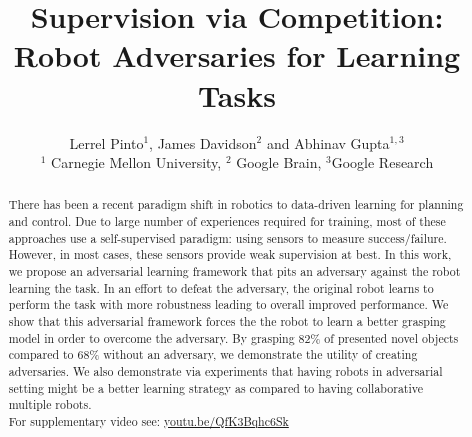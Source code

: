 \documentclass[letterpaper, 10 pt, conference]{ieeeconf}  %
\title{\LARGE \bf Supervision via Competition: Robot Adversaries for Learning Tasks}
\author{Lerrel Pinto$^{1}$, James Davidson$^{2}$ and Abhinav Gupta$^{1,3}$\\
$^{1}$ Carnegie Mellon University, $^{2}$ Google Brain, $^{3}$Google Research
}
\begin{document}
\maketitle
\thispagestyle{empty}
\pagestyle{empty}
\begin{abstract}
There has been a recent paradigm shift in robotics to data-driven learning for planning and control. Due to large number of experiences required for training, most of these approaches use a self-supervised paradigm: using sensors to measure success/failure. However, in most cases, these sensors provide weak supervision at best. In this work, we propose an adversarial learning framework that pits an adversary against the robot learning the task. In an effort to defeat the adversary, the original robot learns to perform the task with more robustness leading to overall improved performance. We show that this adversarial framework forces the the robot to learn a better grasping model in order to overcome the adversary. By grasping 82\% of presented novel objects compared to 68\% without an adversary, we demonstrate the utility of creating adversaries. We also demonstrate via experiments that having robots in adversarial setting might be a better learning strategy as compared to having collaborative multiple robots.
\\
\noindent For supplementary video see: \url{youtu.be/QfK3Bqhc6Sk}



\end{abstract}
\end{document}
